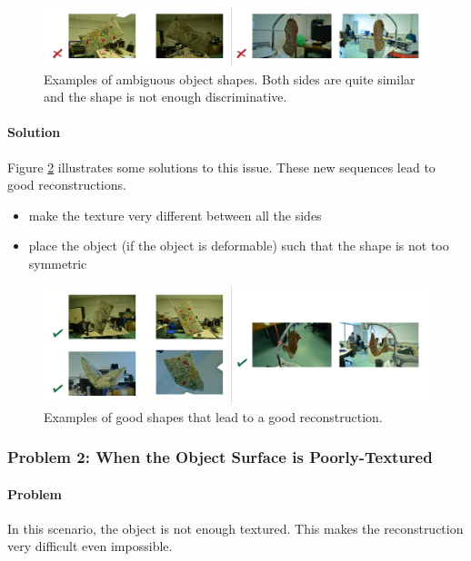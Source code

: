 \documentclass[11pt]{article}
\begin{document}
  \begin{figure}[h]
 	\begin{center}
 		\includegraphics[width=17 cm]{images/wellText_pb.pdf}
 	\end{center}
 	\caption{Examples of ambiguous object shapes. Both sides are quite similar and the shape is not enough discriminative.}
 	\label{fig:wellText_pb}
 \end{figure}


\paragraph{Solution}
Figure \ref{fig:wellText_sol} illustrates some solutions to this issue.
These new sequences lead to good reconstructions.
\begin{itemize}
\item make the texture very different between all the sides
\item place the object (if the object is deformable) such that the shape is not too symmetric
\end{itemize}

  \begin{figure}[h]
 	\begin{center}
 		\includegraphics[width=17 cm]{images/wellText_sol.pdf}
 	\end{center}
 	\caption{Examples of good shapes that lead to a good reconstruction.}
 	\label{fig:wellText_sol}
 \end{figure}

\subsubsection{Problem 2: When the Object Surface is Poorly-Textured}
\paragraph{Problem}
In this scenario, the object is not enough textured.
This makes the reconstruction very difficult even impossible. 
\end{document}

